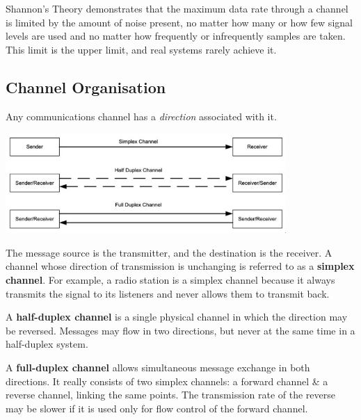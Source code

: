 \documentclass[11pt]{article}
\begin{document}
Shannon's Theory demonstrates that the maximum data rate through a channel is limited by the amount of noise present, no matter 
how many or how few signal levels are used and no matter how frequently or infrequently samples are taken. 
This limit is the upper limit, and real systems rarely achieve it. 

\subsection{Channel Organisation}
Any communications channel has a \textit{direction} associated with it. 

\begin{center}
    \includegraphics[width=0.8\textwidth]{channelorganisation.png}
\end{center}

The message source is the transmitter, and the destination is the receiver. 
A channel whose direction of transmission is unchanging is referred to as a \textbf{simplex channel}. 
For example, a radio station is a simplex channel because it always transmits the signal to its listeners and never allows them 
to transmit back. 

A \textbf{half-duplex channel} is a single physical channel in which the direction may be reversed. 
Messages may flow in two directions, but never at the same time in a half-duplex system. 

A \textbf{full-duplex channel} allows simultaneous message exchange in both directions. 
It really consists of two simplex channels: a forward channel \& a reverse channel, linking the same points. 
The transmission rate of the reverse may be slower if it is used only for flow control of the forward channel. 
\end{document}

